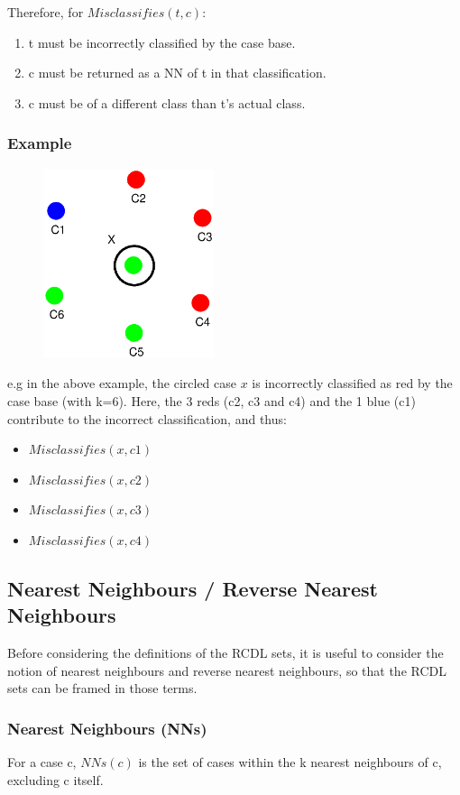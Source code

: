 \documentclass[a4paper,11pt]{report}
\begin{document}
Therefore, for $ Misclassifies(t, c) $:
\begin{enumerate}
	\item t must be incorrectly classified by the case base.
	\item c must be returned as a NN of t in that classification.
	\item c must be of a different class than t's actual class.
\end{enumerate}

\subsubsection{Example}
\begin{figure}[h!]
\includegraphics[width=5cm]{./Drawn/EqualDistanceMisclassifiesEg}
\end{figure}

e.g  in the above example, the circled case $x$ is incorrectly classified as red by the case base (with k=6). Here, the 3 reds (c2, c3 and c4) and the 1 blue (c1) contribute to the incorrect classification, and thus:
\begin{itemize}
	\item $ Misclassifies(x, c1) $
	\item $ Misclassifies(x, c2) $
	\item $ Misclassifies(x, c3) $
	\item $ Misclassifies(x, c4) $
\end{itemize}

\subsection{Nearest Neighbours / Reverse Nearest Neighbours}
Before considering the definitions of the RCDL sets, it is useful to consider the notion of nearest neighbours and reverse nearest neighbours, so that the RCDL sets can be framed in those terms.

\subsubsection{Nearest Neighbours (NNs)}
For a case c, $ NNs(c) $ is the set of cases within the k nearest neighbours of c, excluding c itself.
\end{document}
